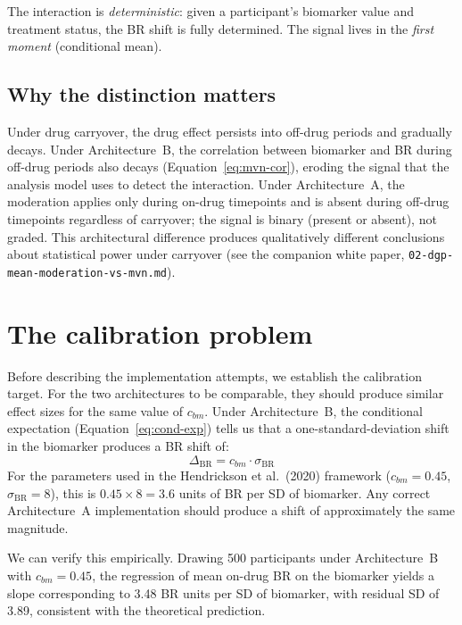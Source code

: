 \documentclass[11pt]{article}
\begin{document}
The interaction is \emph{deterministic}: given a participant's
biomarker value and treatment status, the BR shift is fully
determined. The signal lives in the \emph{first moment}
(conditional mean).

\subsection{Why the distinction matters}

Under drug carryover, the drug effect persists into off-drug
periods and gradually decays. Under Architecture~B, the
correlation between biomarker and BR during off-drug periods
also decays (Equation~\ref{eq:mvn-cor}), eroding the signal
that the analysis model uses to detect the interaction. Under
Architecture~A, the moderation applies only during on-drug
timepoints and is absent during off-drug timepoints regardless
of carryover; the signal is binary (present or absent), not
graded. This architectural difference produces qualitatively
different conclusions about statistical power under carryover
(see the companion white paper,
\texttt{02-dgp-mean-moderation-vs-mvn.md}).

\section{The calibration problem}

Before describing the implementation attempts, we establish
the calibration target. For the two architectures to be
comparable, they should produce similar effect sizes for the
same value of $c_{bm}$. Under Architecture~B, the conditional
expectation (Equation~\ref{eq:cond-exp}) tells us that a
one-standard-deviation shift in the biomarker produces a BR
shift of:
%
\begin{equation}\label{eq:target}
  \Delta_{\text{BR}} = c_{bm} \cdot \sigma_{\text{BR}}
\end{equation}
%
For the parameters used in the Hendrickson et al.\ (2020)
framework ($c_{bm} = 0.45$, $\sigma_{\text{BR}} = 8$), this
is $0.45 \times 8 = 3.6$ units of BR per SD of biomarker.
Any correct Architecture~A implementation should produce a
shift of approximately the same magnitude.

We can verify this empirically. Drawing 500 participants
under Architecture~B with $c_{bm} = 0.45$, the regression
of mean on-drug BR on the biomarker yields a slope
corresponding to 3.48 BR units per SD of biomarker, with
residual SD of 3.89, consistent with the theoretical
prediction.
\end{document}
